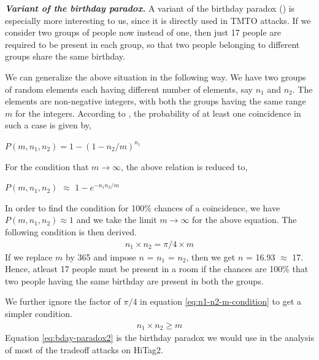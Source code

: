 \noindent \textit{\textbf{Variant of the birthday paradox.}} A variant of the birthday paradox (\cite{GeneralizedAttack}) is especially more interesting to us, since it is directly used in TMTO attacks. If we consider two groups of people now instead of one, then just 17 people are required to be present in each group, so that two people belonging to different groups share the same birthday.  

We can generalize the above situation in the following way. We have two groups of random elements each having different number of elements, say $n_1$ and $n_2$. The elements are non-negative integers, with both the groups having the same range $m$ for the integers. According to \cite{menezes}, the probability of at least one coincidence in such a case is given by,
\begin{center}
$P(m, n_1, n_2) = 1 -(1 - n_2/m)^{n_1}$
\end{center}
For the condition that $m \rightarrow \infty$, the above relation is reduced to,
\begin{center}
$P(m, n_1, n_2)$ $\approx$ $1 - e^{-{n_{1} n_{2}}/{m}}$
\end{center}
In order to find the condition for 100\% chances of a coincidence, we have $P(m, n_1, n_2) \approx 1$ and we take the limit $m \rightarrow \infty$ for the above equation. The following condition is then derived.
\begin{align}
\label{eq:n1-n2-m-condition} n_1 \times n_2 = \pi/4 \times m
\end{align}
If we replace $m$ by 365 and impose $n$ = $n_1$ = $n_2$, then we get $n$ = 16.93 $\approx$ 17. Hence, atleast 17 people must be present in a room if the chances are 100\% that two people having the same birthday are present in both the groups. 

We further ignore the factor of $\pi/4$ in equation \ref{eq:n1-n2-m-condition} to get a simpler condition.  
\begin{align}
\label{eq:bday-paradox2} n_1 \times n_2 \geq m
\end{align}
Equation \ref{eq:bday-paradox2} is the birthday paradox we would use in the analysis of most of the tradeoff attacks on HiTag2.




